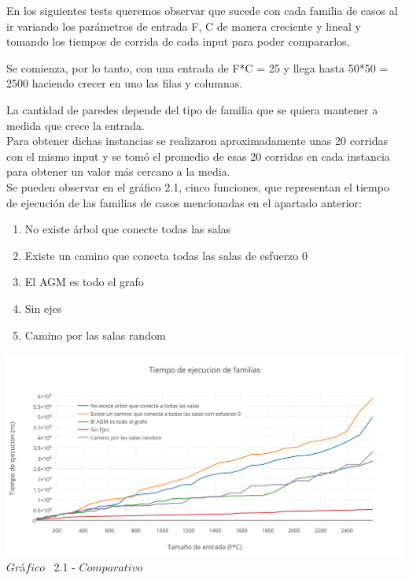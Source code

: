 \indent En los siguientes tests queremos observar que sucede con cada familia de casos al ir variando los parámetros de entrada F, C de manera creciente y lineal y tomando los tiempos de corrida de cada input para poder compararlos.

Se comienza, por lo tanto, con una entrada de F*C = 25 y llega hasta 50*50 = 2500 haciendo crecer en uno las filas y columnas.

La cantidad de paredes depende del tipo de familia que se quiera mantener a medida que crece la entrada.\\

Para obtener dichas instancias se realizaron aproximadamente unas 20 corridas con el mismo input y se tom\'o el promedio de esas 20 corridas en cada instancia para obtener un valor m\'as cercano a la media.\\ 

Se pueden observar en el  gráfico 2.1, cinco funciones, que representan el tiempo de ejecuci\'on de las familias de casos mencionadas en el apartado anterior:

\begin{enumerate}
\item No existe árbol que conecte todas las salas
\item Existe un camino que conecta todas las salas de esfuerzo 0
\item El AGM es todo el grafo
\item Sin ejes
\item Camino por las salas random
\end{enumerate}

\vspace*{0.3cm} \vspace*{0.3cm}
  \begin{center}
 \includegraphics[scale=0.65]{./EJ2/comparativo.png}
 {$Gr$\'a$fico$ \ 2.1 - $Comparativo$}
  \end{center}
  \vspace*{0.3cm}
 

